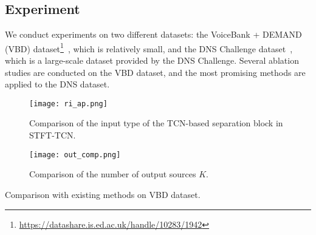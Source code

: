 \documentclass[a4paper]{article}
\begin{document}
\begin{spacing}{0.915}
\vspace{-2mm}
\section{Experiment}
We conduct experiments on two different datasets:
the VoiceBank + DEMAND (VBD) dataset\footnote{
\url{https://datashare.is.ed.ac.uk/handle/10283/1942}
}~\cite{veaux2013voice,thiemann2013diverse,valentini2016investigating}, which is relatively small, and the DNS Challenge dataset~\cite{reddy2020interspeech}, which is a large-scale dataset provided by the DNS Challenge.
Several ablation studies are conducted on the VBD dataset, 
and the most promising methods are applied to the DNS dataset.

\begin{figure}[t]
  \centering
  \texttt{[image: ri\_ap.png]}
  \caption{Comparison of the input type of the TCN-based separation block in STFT-TCN.}
\label{fig:ri_ap}
\end{figure}


\begin{figure}[tb]
  \centering
  \texttt{[image: out\_comp.png]}
  \caption{Comparison of the number of output sources $K$.} \label{fig:out_comp}
\end{figure}

    

\begin{table}[tb]
\begin{center}
    \caption{Comparison with existing methods on VBD dataset.}
  \label{tab:all_comp}
\scalebox{0.68}{

}
\end{center}
\end{table}
\end{spacing}
\end{document}
